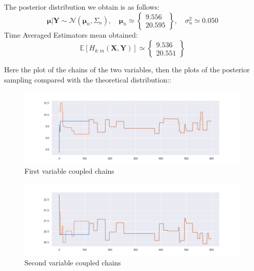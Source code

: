 \documentclass {article}
\begin{document}
The posterior distribution we obtain is as follows:
$$  \boldsymbol{\mu} | \boldsymbol{Y} \sim \mathcal{N}(\boldsymbol{\mu}_n, \Sigma_n), 
\quad \boldsymbol{\mu}_n \simeq \begin{Bmatrix}   
9.556 \\
20.595
\end{Bmatrix} ,
\quad
\sigma^2_n
\simeq 0.050  $$
Time Averaged Estimators mean obtained:
$$ \mathbb{E}[H_{k:m}(\boldsymbol{X},\boldsymbol{Y})] \simeq \begin{Bmatrix}   
9.536 \\
20.551
\end{Bmatrix}$$

Here the plot of the chains of the two variables, then the plots of the posterior sampling compared with the theoretical distribution::
\begin{figure}[h!]
	\centering
	\includegraphics[width=\textwidth]{immagini_abc_coupling_multivariate/coupling_abc_mult_chain_meeeting_1}	
	\caption{First variable coupled chains}
\end{figure}
\begin{figure}[h!]
	\centering
	\includegraphics[width=\textwidth]{immagini_abc_coupling_multivariate/coupling_abc_mult_chain_meeeting_2}	
	\caption{Second variable coupled chains}
\end{figure}
\end{document}

